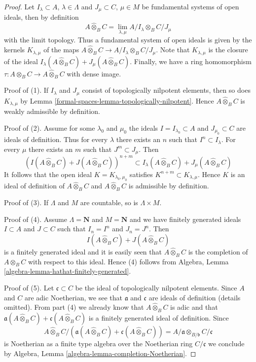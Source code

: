\begin{proof}
Let $I_\lambda \subset A$, $\lambda \in \Lambda$ and
$J_\mu \subset C$, $\mu \in M$
be fundamental systems of open ideals, then by definition
$$
A \widehat{\otimes}_B C =
\lim_{\lambda, \mu} A/I_\lambda \otimes_B C/J_\mu
$$
with the limit topology. Thus a fundamental system of open ideals
is given by the kernels $K_{\lambda, \mu}$ of the maps
$A \widehat{\otimes}_B C \to A/I_\lambda \otimes_B C/J_\mu$.
Note that $K_{\lambda, \mu}$ is the closure of the ideal
$I_\lambda(A \widehat{\otimes}_B C) + J_\mu(A \widehat{\otimes}_B C)$.
Finally, we have a ring homomorphism
$\tau : A \otimes_B C \to A \widehat{\otimes}_B C$ with dense image.

\medskip\noindent
Proof of (1). If $I_\lambda$ and $J_\mu$ consist of topologically
nilpotent elements, then so does $K_{\lambda, \mu}$ by
Lemma \ref{formal-spaces-lemma-topologically-nilpotent}. Hence
$A \widehat{\otimes}_B C$ is weakly admissible by definition.

\medskip\noindent
Proof of (2). Assume for some $\lambda_0$ and $\mu_0$ the ideals
$I = I_{\lambda_0} \subset A$ and $J_{\mu_0} \subset C$ are ideals of
definition. Thus for every $\lambda$ there exists an $n$ such that
$I^n \subset I_\lambda$. For every $\mu$ there exists an $m$ such that
$J^m \subset J_\mu$. Then
$$
\left(I(A \widehat{\otimes}_B C) + J(A \widehat{\otimes}_B C)\right)^{n + m}
\subset
I_\lambda(A \widehat{\otimes}_B C) + J_\mu(A \widehat{\otimes}_B C)
$$
It follows that the open ideal $K = K_{\lambda_0, \mu_0}$
satisfies $K^{n + m} \subset K_{\lambda, \mu}$. Hence $K$
is an ideal of definition of $A \widehat{\otimes}_B C$
and $A \widehat{\otimes}_B C$ is admissible by definition.

\medskip\noindent
Proof of (3). If $\Lambda$ and $M$ are countable, so is
$\Lambda \times M$.

\medskip\noindent
Proof of (4). Assume $\Lambda = \mathbf{N}$ and $M = \mathbf{N}$
and we have finitely generated ideals $I \subset A$ and $J \subset C$
such that $I_n = I^n$ and $J_n = J^n$. Then
$$
I(A \widehat{\otimes}_B C) + J(A \widehat{\otimes}_B C)
$$
is a finitely generated ideal and it is easily seen that
$A \widehat{\otimes}_B C$ is the completion of
$A \otimes_B C$ with respect to this ideal. Hence (4)
follows from Algebra, Lemma \ref{algebra-lemma-hathat-finitely-generated}.

\medskip\noindent
Proof of (5).
Let $\mathfrak c \subset C$ be the ideal of topologically nilpotent elements.
Since $A$ and $C$ are adic Noetherian, we see that
$\mathfrak a$ and $\mathfrak c$ are ideals of definition (details omitted).
From part (4) we already know that
$A \widehat{\otimes}_B C$ is adic and that
$\mathfrak a(A \widehat{\otimes}_B C) + \mathfrak c(A \widehat{\otimes}_B C)$
is a finitely generated ideal of definition. Since
$$
A \widehat{\otimes}_B C /
\left(\mathfrak a(A \widehat{\otimes}_B C) +
\mathfrak c(A \widehat{\otimes}_B C)\right)
=
A/\mathfrak a \otimes_{B/\mathfrak b} C/\mathfrak c
$$
is Noetherian as a finite type algebra over the Noetherian ring
$C/\mathfrak c$ we conclude by
Algebra, Lemma \ref{algebra-lemma-completion-Noetherian}.
\end{proof}

